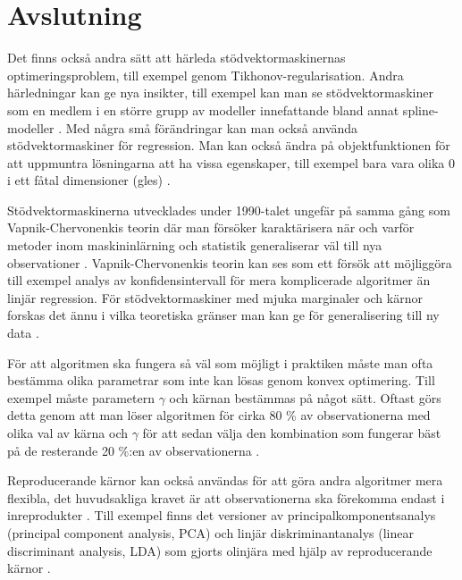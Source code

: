 \documentclass[a4paper, 12pt]{report}
\theoremstyle{definition}
\theoremstyle{remark}
\begin{document}
\chapter{Avslutning}
Det finns också andra sätt att härleda stödvektormaskinernas optimeringsproblem, till exempel genom Tikhonov-regularisation. Andra härledningar kan ge nya insikter, till exempel kan man se stödvektormaskiner som en medlem i en större grupp av modeller innefattande bland annat spline-modeller \cite{ESL}. Med några små förändringar kan man också använda stödvektormaskiner för regression. Man kan också ändra på objektfunktionen för att uppmuntra lösningarna att ha vissa egenskaper, till exempel bara vara olika 0 i ett fåtal dimensioner (gles) \cite{LearningKernels}.

Stödvektormaskinerna utvecklades under 1990-talet ungefär på samma gång som Vapnik-Chervonenkis teorin där man försöker karaktärisera när och varför metoder inom maskininlärning och statistik generaliserar väl till nya observationer \cite{VC}. Vapnik-Chervonenkis teorin kan ses som ett försök att möjliggöra till exempel analys av konfidensintervall för mera komplicerade algoritmer än linjär regression. För stödvektormaskiner med mjuka marginaler och kärnor forskas det ännu i vilka teoretiska gränser man kan ge för generalisering till ny data \cite{theoretical}.

För att algoritmen ska fungera så väl som möjligt i praktiken måste man ofta bestämma olika parametrar som inte kan lösas genom konvex optimering. Till exempel måste parametern $\gamma$ och kärnan bestämmas på något sätt. Oftast görs detta genom att man löser algoritmen för cirka 80 \% av observationerna med olika val av kärna och $\gamma$ för att sedan välja den kombination som fungerar bäst på de resterande 20 \%:en av observationerna \cite{ESL}.

Reproducerande kärnor kan också användas för att göra andra algoritmer mera flexibla, det huvudsakliga kravet är att observationerna ska förekomma endast i inreprodukter \cite{ESL, LearningKernels}. Till exempel finns det versioner av principalkomponentsanalys (principal component analysis, PCA) och linjär diskriminantanalys (linear discriminant analysis, LDA) som gjorts olinjära med hjälp av reproducerande kärnor \cite{ESL}.



\end{document}
